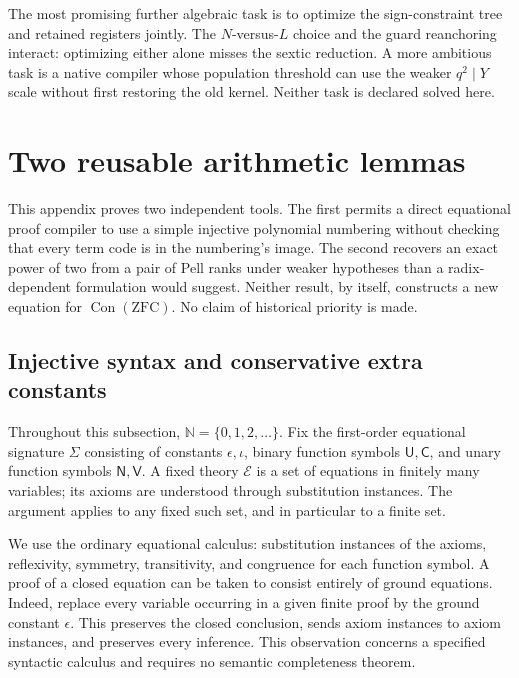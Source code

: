 \documentclass[11pt,a4paper]{article}
\theoremstyle{definition}
\begin{document}
The most promising further algebraic task is to optimize the
sign-constraint tree and retained registers jointly. The
\(N\)-versus-\(L\) choice and the guard reanchoring interact:
optimizing either alone misses the sextic reduction.
A more ambitious task is a native compiler whose population
threshold can use the weaker \(q^2\mid Y\) scale without first
restoring the old kernel. Neither task is declared solved
here.

\appendix
\newtheorem{auxsyntaxthm}{Theorem}[section]
\newtheorem{auxsyntaxlem}[auxsyntaxthm]{Lemma}
\newtheorem{auxsyntaxprop}[auxsyntaxthm]{Proposition}

\section{Two reusable arithmetic lemmas}
\label{sec:reusable-arithmetic-lemmas}

This appendix proves two independent tools.  The first permits a direct
equational proof compiler to use a simple injective polynomial numbering
without checking that every term code is in the numbering's image.  The
second recovers an exact power of two from a pair of Pell ranks under
weaker hypotheses than a radix-dependent formulation would suggest.
Neither result, by itself, constructs a new equation for
$\operatorname{Con}(\mathrm{ZFC})$.  No claim of historical priority is made.

\subsection{Injective syntax and conservative extra constants}

Throughout this subsection, $\mathbb N=\{0,1,2,\ldots\}$.  Fix the
first-order equational signature $\Sigma$ consisting of constants
$\epsilon,\iota$, binary function symbols $\mathsf U,\mathsf C$, and unary
function symbols $\mathsf N,\mathsf V$.  A fixed theory $\mathcal E$ is a
set of equations in finitely many variables; its axioms are understood
through substitution instances.  The argument applies to any fixed such
set, and in particular to a finite set.

We use the ordinary equational calculus: substitution instances of the
axioms, reflexivity, symmetry, transitivity, and congruence for each
function symbol.  A proof of a closed equation can be taken to consist
entirely of ground equations.  Indeed, replace every variable occurring
in a given finite proof by the ground constant $\epsilon$.  This preserves
the closed conclusion, sends axiom instances to axiom instances, and
preserves every inference.  This observation concerns a specified
syntactic calculus and requires no semantic completeness theorem.
\end{document}
